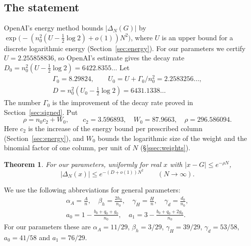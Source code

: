 \documentclass[11pt]{amsart}
\newcommand{\Rho}{296.586094}
\newcommand{\Ctwo}{3.596893}
\newcommand{\WZero}{87.9663}
\newcommand{\Utarget}{2.255858836}
\newcommand{\Gain}{8.29824}
\newcommand{\Uzero}{2.2583256}
\newcommand{\Decay}{6431.1338}
\newcommand{\DecayOA}{6422.8355}
\newtheorem{theorem}{Theorem}[section]
\theoremstyle{definition}
\theoremstyle{remark}
\numberwithin{equation}{section}
\begin{document}
\subsection{The statement}
OpenAI's energy method bounds $|\Delta_N(G)|$ by $\exp\bigl(-(n_0^2(U-\frac12\log2)+o(1))N^2\bigr)$, where $U$
is an upper bound for a discrete logarithmic energy (Section~\ref{sec:energy}). For our parameters we
certify $U=\Utarget$, so OpenAI's estimate gives the decay rate $D_0=n_0^2(U-\frac12\log2)=\DecayOA\ldots$
Let
\begin{gather*}
 \Gamma_0=\Gain,\qquad U_0=U+\Gamma_0/n_0^2=\Uzero\ldots,\\
 D=n_0^2(U_0-\tfrac12\log2)=\Decay\ldots
\end{gather*}
The number $\Gamma_0$ is the improvement of the decay rate proved in Section~\ref{sec:signed}. Put
\begin{equation}\label{eq:rho-def}
 \rho=n_0c_2+W_0,\qquad c_2=\Ctwo,\quad W_0=\WZero,\quad \rho=\Rho .
\end{equation}
Here $c_2$ is the increase of the energy bound per prescribed column (Section~\ref{sec:energy}), and $W_0$
bounds the logarithmic size of the weight and the binomial factor of one column, per unit of $N$
(\S\ref{ssec:weights}).

\begin{theorem}\label{thm:real}
For our parameters, uniformly for real $x$ with $|x-G|\le e^{-\rho N}$,
\[
 |\Delta_N(x)|\le e^{-(D+o(1))N^2}\qquad(N\to\infty).
\]
\end{theorem}

We use the following abbreviations for general parameters:
\begin{gather*}
 \alpha_A=\frac An,\quad \beta_h=\frac{2h_0}{n_0},\quad \gamma_H=\frac Hn,\quad \gamma_d=\frac{d_0}{n_0},\\
 a_0=1-\frac{b_0+q_0+g_0}{n_0},\quad a_1=3-\frac{b_0+q_0+2g_0}{n_0}.
\end{gather*}
For our parameters these are $\alpha_A=11/29$, $\beta_h=3/29$, $\gamma_H=39/29$, $\gamma_d=53/58$,
$a_0=41/58$ and $a_1=76/29$.
\end{document}
